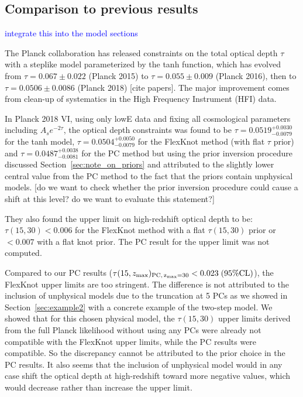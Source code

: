 \documentclass[prd,twocolumn,amsmath,amssymb,floatfix,superscriptaddress,nofootinbib]{revtex4-1}
\newcommand{\zmax}{z_{\rm max}}
\newcommand{\wh}[1]{\textcolor{blue}{#1}}
\begin{document}
{

\appendix



\subsection{Comparison to previous results}
\wh{integrate this into the model sections}

The Planck collaboration has released constraints on the total optical depth $\tau$ with a steplike model parameterized by the tanh function, which has evolved from $\tau = 0.067 \pm 0.022$ (Planck 2015) to $\tau = 0.055 \pm 0.009$ (Planck 2016), then to $\tau = 0.0506 \pm 0.0086$ (Planck 2018) [cite papers]. The major improvement comes from clean-up of systematics in the High Frequency Instrument (HFI) data. 

In Planck 2018 VI, using only lowE data and fixing all cosmological parameters including $A_s e^{-2\tau}$, the optical depth constraints was found to be $\tau = 0.0519^{+0.0030}_{-0.0079}$ for the tanh model, 
$\tau = 0.0504^{+0.0050}_{-0.0079}$ 
for the FlexKnot method (with flat $\tau$ prior) and 
$\tau = 0.0487^{+0.0038}_{-0.0081}$
for the PC method but using the prior inversion procedure
discussed Section~\ref{sec:note_on_priors} and attributed to the slightly lower central value from the PC method to the fact that the priors contain unphysical models. [do we want to check whether the prior inversion procedure could cause a shift at this level? do we want to evaluate this statement?]

They also found the upper limit on high-redshift optical depth to be: $\tau(15, 30) < 0.006$ for the FlexKnot method with a flat $\tau(15, 30)$ prior or $<0.007$ with a flat knot prior. The PC result for the upper limit was not computed. 

Compared to our PC results ($\tau(15, \zmax)_{\rm PC,\, \zmax=30} < 0.023 \; (95\% \mathrm{CL})$), the FlexKnot upper limits are too stringent. The difference is not attributed to the inclusion of unphysical models due to the truncation at 5 PCs as we showed in Section~\ref{sec:example2} with a concrete example of the two-step model. We showed that for this chosen physical model, the $\tau(15, 30)$ upper limits derived from the full Planck likelihood without using any PCs were already not compatible with the FlexKnot upper limits, while the PC results were compatible. So the discrepancy cannot be attributed to the prior choice in the PC results. It also seems that the inclusion of unphysical model would in any case shift the optical depth at high-redshift toward more negative values, which would decrease rather than increase the upper limit. 

}
\end{document}
